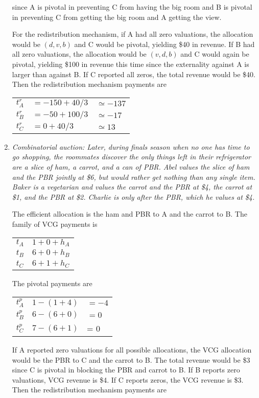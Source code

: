 \documentclass[10pt]{article}
\begin{document}
\begin{spacing}{1.0}
\begin{enumerate}
  since A is pivotal in preventing C from having the big room and B is
  pivotal in preventing C from getting the big room and A getting the
  view.

  For the redistribution mechanism, if A had all zero valuations, the
  allocation would be $(d, v, b)$ and C would be pivotal, yielding \$40 in
  revenue. If B had all zero valuations, the allocation would be $(v, d,
  b)$ and C would again be pivotal, yielding \$100 in revenue this time
  since the externality against A is larger than against B. If C reported
  all zeros, the total revenue would be \$40. Then the redistribution
  mechanism payments are

  \begin{tabular}{lll}
    $t_A^r$ & $= -150 + 40/3$ & $\simeq -137$ \\
    $t_B^r$ & $= -50 + 100/3$ & $\simeq -17$ \\
    $t_C^r$ & $= 0 + 40/3$ & $\simeq 13$
  \end{tabular}

\item \textit{Combinatorial auction: Later, during finals season when no
    one has time to go shopping, the roommates discover the only things
    left in their refrigerator are a slice of ham, a carrot, and a can of
    PBR. Abel values the slice of ham and the PBR jointly at \$6, but
    would rather get nothing than any single item. Baker is a vegetarian
    and values the carrot and the PBR at \$4, the carrot at \$1, and the
    PBR at \$2. Charlie is only after the PBR, which he values at \$4.}

  The efficient allocation is the ham and PBR to A and the carrot to
  B. The family of VCG payments is

  \begin{tabular}{ll}
    $t_A$ & $1 + 0 + h_A$ \\
    $t_B$ & $6 + 0 + h_B$ \\
    $t_C$ & $6 + 1 + h_C$
  \end{tabular}

  The pivotal payments are

  \begin{tabular}{lll}
    $t_A^p$ & $1 - (1 + 4)$ & $= -4$ \\
    $t_B^p$ & $6 - (6 + 0)$ & $= 0$ \\
    $t_C^p$ & $7 - (6 + 1)$ &= 0
  \end{tabular}

  If A reported zero valuations for all possible allocations, the VCG
  allocation would be the PBR to C and the carrot to B. The total revenue
  would be \$3 since C is pivotal in blocking the PBR and carrot to
  B. If B reports zero valuations, VCG revenue is \$4. If C reports zeros,
  the VCG revenue is \$3. Then the redistribution mechanism payments are


\end{enumerate}
\end{spacing}
\end{document}
